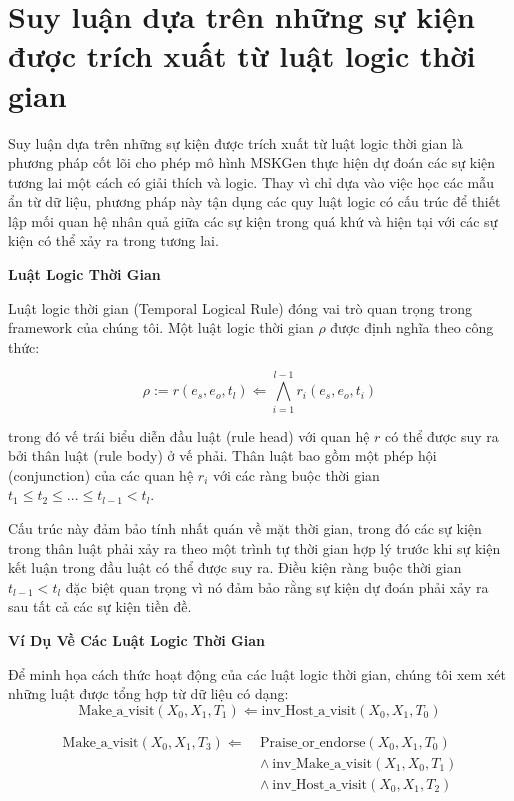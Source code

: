 \section{Suy luận dựa trên những sự kiện được trích xuất từ luật logic thời gian}

Suy luận dựa trên những sự kiện được trích xuất từ luật logic thời gian là phương pháp cốt lõi cho phép mô hình MSKGen thực hiện dự đoán các sự kiện tương lai một cách có giải thích và logic. Thay vì chỉ dựa vào việc học các mẫu ẩn từ dữ liệu, phương pháp này tận dụng các quy luật logic có cấu trúc để thiết lập mối quan hệ nhân quả giữa các sự kiện trong quá khứ và hiện tại với các sự kiện có thể xảy ra trong tương lai.

\textbf{Luật Logic Thời Gian}

Luật logic thời gian (Temporal Logical Rule) đóng vai trò quan trọng trong framework của chúng tôi. Một luật logic thời gian $\rho$ được định nghĩa theo công thức:

\[
\rho := r(e_s, e_o, t_l) \Leftarrow \bigwedge_{i=1}^{l-1} r_i(e_s, e_o, t_i)
\]

trong đó vế trái biểu diễn đầu luật (rule head) với quan hệ $r$ có thể được suy ra bởi thân luật (rule body) ở vế phải. Thân luật bao gồm một phép hội (conjunction) của các quan hệ $r_i$ với các ràng buộc thời gian $t_1 \leq t_2 \leq ... \leq t_{l-1} < t_l$.


Cấu trúc này đảm bảo tính nhất quán về mặt thời gian, trong đó các sự kiện trong thân luật phải xảy ra theo một trình tự thời gian hợp lý trước khi sự kiện kết luận trong đầu luật có thể được suy ra. Điều kiện ràng buộc thời gian $t_{l-1} < t_l$ đặc biệt quan trọng vì nó đảm bảo rằng sự kiện dự đoán phải xảy ra sau tất cả các sự kiện tiền đề.

\textbf{Ví Dụ Về Các Luật Logic Thời Gian}

Để minh họa cách thức hoạt động của các luật logic thời gian, chúng tôi xem xét những luật được tổng hợp từ dữ liệu có dạng:\begin{equation}
\text{Make\_a\_visit}(X_0, X_1, T_1) \Leftarrow \text{inv\_Host\_a\_visit}(X_0, X_1, T_0)
\tag{1}
\label{rule1}
\end{equation}

\begin{equation}
\begin{aligned}
\text{Make\_a\_visit}(X_0, X_1, T_3) \Leftarrow\ &\text{Praise\_or\_endorse}(X_0, X_1, T_0) \\
&\land\ \text{inv\_Make\_a\_visit}(X_1, X_0, T_1) \\
&\land\ \text{inv\_Host\_a\_visit}(X_0, X_1, T_2)
\end{aligned}
\tag{2}
\label{rule2}
\end{equation}

